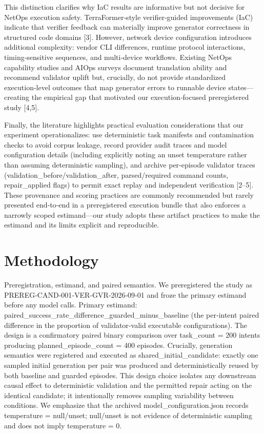 \documentclass[conference]{IEEEtran}
\begin{document}
This distinction clarifies why IaC results are informative but not decisive for NetOps execution safety. TerraFormer‑style verifier‑guided improvements (IaC) indicate that verifier feedback can materially improve generator correctness in structured code domains [3]. However, network device configuration introduces additional complexity: vendor CLI differences, runtime protocol interactions, timing‑sensitive sequences, and multi‑device workflows. Existing NetOps capability studies and AIOps surveys document translation ability and recommend validator uplift but, crucially, do not provide standardized execution‑level outcomes that map generator errors to runnable device states---creating the empirical gap that motivated our execution‑focused preregistered study [4,5].

Finally, the literature highlights practical evaluation considerations that our experiment operationalizes: use deterministic task manifests and contamination checks to avoid corpus leakage, record provider audit traces and model configuration details (including explicitly noting an unset temperature rather than assuming deterministic sampling), and archive per‑episode validator traces (validation\_before/validation\_after, parsed/required command counts, repair\_applied flags) to permit exact replay and independent verification [2--5]. These provenance and scoring practices are commonly recommended but rarely presented end‑to‑end in a preregistered execution bundle that also enforces a narrowly scoped estimand---our study adopts these artifact practices to make the estimand and its limits explicit and reproducible.

\section{Methodology}
Preregistration, estimand, and paired semantics. We preregistered the study as PREREG‑CAND‑001‑VER‑GVR‑2026‑09‑01 and froze the primary estimand before any model calls. Primary estimand: paired\_success\_rate\_difference\_guarded\_minus\_baseline (the per‑intent paired difference in the proportion of validator‑valid executable configurations). The design is a confirmatory paired binary comparison over task\_count = 200 intents producing planned\_episode\_count = 400 episodes. Crucially, generation semantics were registered and executed as shared\_initial\_candidate: exactly one sampled initial generation per pair was produced and deterministically reused by both baseline and guarded episodes. This design choice isolates any downstream causal effect to deterministic validation and the permitted repair acting on the identical candidate; it intentionally removes sampling variability between conditions. We emphasize that the archived model\_configuration.json records temperature = null/unset; null/unset is not evidence of deterministic sampling and does not imply temperature = 0.
\end{document}
